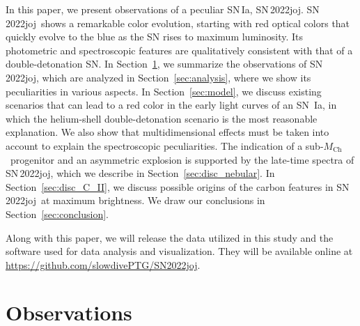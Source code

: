 \documentclass[twocolumn]{aastex631}
\newcommand{\sn}{SN\,2022joj}
\newcommand{\Mch}{$M_\mathrm{Ch}$}
\newcommand{\chang}[1]{\textcolor{blue}{[Chang: #1]}}
\begin{document}
\begin{CJK*}{UTF8}{gbsn}
In this paper, we present observations of a peculiar SN\,Ia, \sn. \sn\ shows a remarkable color evolution, starting with red optical colors that quickly evolve to the blue as the SN rises to maximum luminosity. Its photometric and spectroscopic features are qualitatively consistent with that of a double-detonation SN. In Section~\ref{sec:obs}, we summarize the observations of \sn, which are analyzed in Section~\ref{sec:analysis}, where we show its peculiarities in various aspects. In Section~\ref{sec:model}, we discuss existing scenarios that can lead to a red color in the early light curves of an SN \,Ia, in which the helium-shell double-detonation scenario is the most reasonable explanation. We also show that multidimensional effects must be taken into account to explain the spectroscopic peculiarities. 
The indication of a sub-\Mch\ progenitor and an asymmetric explosion is supported by the late-time spectra of \sn, which we describe in Section~\ref{sec:disc_nebular}. In Section~\ref{sec:disc_C_II}, we discuss possible origins of the carbon features in \sn\ at maximum brightness.
We draw our conclusions in Section~\ref{sec:conclusion}.

Along with this paper, we will release the data utilized in this study and the software used for data analysis and visualization. They will be available online at \url{https://github.com/slowdivePTG/SN2022joj}.



\section{Observations} \label{sec:obs}

\end{CJK*}
\end{document}
